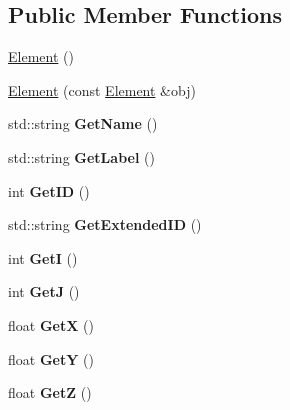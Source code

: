 \subsection*{Public Member Functions}
\begin{DoxyCompactItemize}
\item 
\hyperlink{classElement_ab0d0e20be9a36ae676202db753faeec9}{Element} ()
\item 
\hyperlink{classElement_a35c96bb94fc3c42ebb4eab1c51ce2a63}{Element} (const \hyperlink{classElement}{Element} \&obj)
\item 
\hypertarget{classElement_aa38eb6cc012786635a632f11ec0c3c41}{std\+::string {\bfseries Get\+Name} ()}\label{classElement_aa38eb6cc012786635a632f11ec0c3c41}

\item 
\hypertarget{classElement_a12f6f5b01cd73e62382f319dbd71129b}{std\+::string {\bfseries Get\+Label} ()}\label{classElement_a12f6f5b01cd73e62382f319dbd71129b}

\item 
\hypertarget{classElement_a01c2709f33fe0773cad6089e8fc7261b}{int {\bfseries Get\+I\+D} ()}\label{classElement_a01c2709f33fe0773cad6089e8fc7261b}

\item 
\hypertarget{classElement_afedae45e6b3dd9f9a66a68a6e2acb937}{std\+::string {\bfseries Get\+Extended\+I\+D} ()}\label{classElement_afedae45e6b3dd9f9a66a68a6e2acb937}

\item 
\hypertarget{classElement_aa192e6c35a460ea561021f3b37c6700a}{int {\bfseries Get\+I} ()}\label{classElement_aa192e6c35a460ea561021f3b37c6700a}

\item 
\hypertarget{classElement_afb05febdece810f4b83541624fe530ee}{int {\bfseries Get\+J} ()}\label{classElement_afb05febdece810f4b83541624fe530ee}

\item 
\hypertarget{classElement_a0642f0da63632170f9fa9df021c977f1}{float {\bfseries Get\+X} ()}\label{classElement_a0642f0da63632170f9fa9df021c977f1}

\item 
\hypertarget{classElement_a4c4f314d040db786a716ed916a42ebd7}{float {\bfseries Get\+Y} ()}\label{classElement_a4c4f314d040db786a716ed916a42ebd7}

\item 
\hypertarget{classElement_af03625767fde8b12a09add84108c3f2d}{float {\bfseries Get\+Z} ()}\label{classElement_af03625767fde8b12a09add84108c3f2d}


\end{DoxyCompactItemize}
